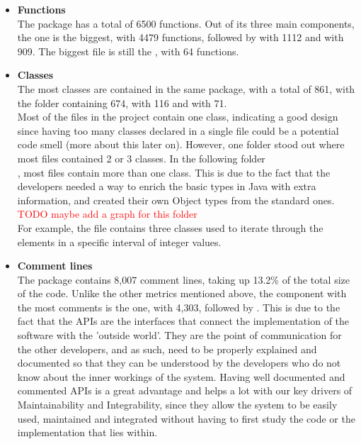 \begin{itemize}
                \item \textbf{Functions}\\
                    The  package has a total of 6500 functions. Out of its three main components, the  one is the biggest, with 4479 functions, followed by  with 1112 and  with 909. The biggest file is still the , with 64 functions.
                \item \textbf{Classes}\\
                    The most classes are contained in the same package, with a total of 861, with the  folder containing 674,  with 116 and  with 71. \\
                    Most of the files in the project contain one class, indicating a good design since having too many classes declared in a single file could be a potential code smell (more about this later on). However, one folder stood out where most files contained 2 or 3 classes. In the following folder
                    \\ , most files contain more than one class. This is due to the fact that the developers needed a way to enrich the basic types in Java with extra information, and created their own Object types from the standard ones. 
                    \textcolor{red}{TODO maybe add a graph for this folder}
                    \\ For example, the file  contains three classes used to iterate through the elements in a specific interval of integer values. 
                \item \textbf{Comment lines}\\
                    The  package contains 8,007 comment lines, taking up 13.2\% of the total size of the code. Unlike the other metrics mentioned above, the component with the most comments is the  one, with 4,303, followed by . This is due to the fact that the APIs are the interfaces that connect the implementation of the software with the 'outside world'. They are the point of communication for the other developers, and as such, need to be properly explained and documented so that they can be understood by the developers who do not know about the inner workings of the system. Having well documented and commented APIs is a great advantage and helps a lot with our key drivers of Maintainability and Integrability, since they allow the system to be easily used, maintained and integrated without having to first study the code or the implementation that lies within.
            \end{itemize}
